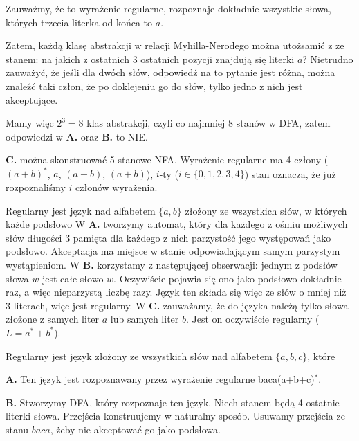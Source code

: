 \begin{solutions}
    Zauważmy, że to wyrażenie regularne, rozpoznaje dokładnie wszystkie słowa, których trzecia literka od końca to $a$.

    Zatem, każdą klasę abstrakcji w relacji Myhilla-Nerodego można utożsamić z ze stanem: na jakich z ostatnich 3 ostatnich
    pozycji znajdują się literki $a$? Nietrudno zauważyć, że jeśli dla dwóch słów, odpowiedź na to pytanie jest różna,
    można znaleźć taki człon, że po doklejeniu go do słów, tylko jedno z nich jest akceptujące.

    Mamy więc $2^3 = 8$ klas abstrakcji, czyli co najmniej 8 stanów w DFA, zatem odpowiedzi w \textbf{A.} oraz \textbf{B.} to NIE.

    \textbf{C.} można skonstruować 5-stanowe NFA. Wyrażenie regularne ma 4 człony ($(a + b)^*$, $a$, $(a + b)$, $(a + b)$),
    $i$-ty ($i \in \{ 0, 1, 2, 3, 4 \}$) stan oznacza, że już rozpoznaliśmy $i$ członów wyrażenia.
    

    \sol Regularny jest język nad alfabetem $\{a,b\}$ złożony ze wszystkich słów, w których każde podsłowo
    W \textbf{A.} tworzymy automat, który dla każdego z ośmiu możliwych słów długości 3 pamięta dla każdego z nich parzystość jego występowań jako podsłowo. Akceptacja ma miejsce w stanie odpowiadającym samym parzystym wystąpieniom. W \textbf{B.} korzystamy z następującej obserwacji: jednym z podsłów słowa $w$ jest całe słowo $w$. Oczywiście pojawia się ono jako podsłowo dokładnie raz, a więc nieparzystą liczbę razy. Język ten składa się więc ze słów o mniej niż 3 literach, więc jest regularny. W \textbf{C.} zauważamy, że do języka należą tylko słowa złożone z samych liter $a$ lub samych liter $b$. Jest on oczywiście regularny ($L = a^* + b^*$).

    \sol Regularny jest język złożony ze wszystkich słów nad alfabetem $\{a,b,c\}$, które

    \textbf{A.} Ten język jest rozpoznawany przez wyrażenie regularne {\ttfamily baca(a+b+c)$^*$}.
    
    \textbf{B.} Stworzymy DFA, który rozpoznaje ten język. Niech stanem będą 4 ostatnie literki słowa. Przejścia konstruujemy w naturalny sposób.
    Usuwamy przejścia ze stanu $baca$, żeby nie akceptować go jako podsłowa.


\end{solutions}
